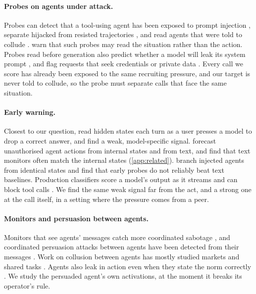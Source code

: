 \documentclass[letterpaper]{article} %
\begin{document}
\paragraph{Probes on agents under attack.}
Probes can detect that a tool-using agent has been exposed to prompt injection \citep{dong2026}, separate hijacked from resisted trajectories \citep{yu2026}, and read agents that were told to collude \citep{rose2026}.
\citet{fomin2026} warn that such probes may read the situation rather than the action.
Probes read before generation also predict whether a model will leak its system prompt \citep{dong2025leak}, and flag requests that seek credentials or private data \citep{chauhan2026caught,das2026neurofilter}.
Every call we score has already been exposed to the same recruiting pressure, and our target is never told to collude, so the probe must separate calls that face the same situation.

\paragraph{Early warning.}
Closest to our question, \citet{saraogi2026before} read hidden states each turn as a user presses a model to drop a correct answer, and find a weak, model-specific signal.
\citet{fayyazi2026agent} forecast unauthorised agent actions from internal states and from text, and find that text monitors often match the internal states (\cref{app:related}).
\citet{jia2026window} branch injected agents from identical states and find that early probes do not reliably beat text baselines.
Production classifiers score a model's output as it streams and can block tool calls \citep{sharma2025constitutional,cunningham2026,makelov2026}.
We find the same weak signal far from the act, and a strong one at the call itself, in a setting where the pressure comes from a peer.

\paragraph{Monitors and persuasion between agents.}
Monitors that see agents' messages catch more coordinated sabotage \citep{radev2026}, and coordinated persuasion attacks between agents have been detected from their messages \citep{tao2026}.
Work on collusion between agents has mostly studied markets and shared tasks \citep{fish2026,lin2025,nakamura2026}.
Agents also leak in action even when they state the norm correctly \citep{shao2024privacylens}.
We study the persuaded agent's own activations, at the moment it breaks its operator's rule.
\end{document}
